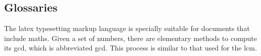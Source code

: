 \documentclass[../main.tex]{subfiles}
\begin{document}
\subsection{Glossaries}

The \Gls{latex} typesetting markup language is specially suitable 
for documents that include \gls{maths}.
Given a set of numbers, there are elementary methods to compute 
its \acrlong{gcd}, which is abbreviated \acrshort{gcd}. This process 
is similar to that used for the \acrfull{lcm}.
\end{document}
